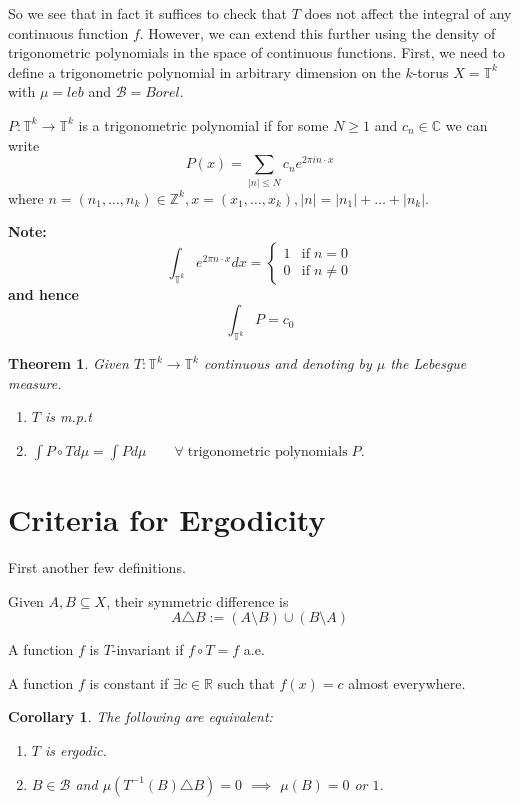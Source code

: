 \documentclass[11pt]{article}
\newcommand{\defeq}{:=}
\newcommand{\abs}[1]{\left|#1\right|}
\newcommand{\symd}{\triangle}
\newcommand{\ktor}{\mathbb{T}^k}
\newcommand{\R}{\mathbb{R}}
\newcommand{\C}{\mathbb{C}}
\newcommand{\Z}{\mathbb{Z}}
\newenvironment{defin}
	{\begin{mdframed}[backgroundcolor=white, roundcorner=5pt, linewidth=1pt]}
	{\end{mdframed}}
\newcommand{\mdf}[1]{{\color{red} #1}}
\newenvironment{note}
	{\begin{mdframed}[backgroundcolor=white, linecolor=red, roundcorner=5pt, linewidth=1pt]\bfseries{Note:}\normalfont}
	{\end{mdframed}}
\newtheorem{theorem}[prop]{Theorem}
\newtheorem{cor}[prop]{Corollary}
\begin{document}
So we see that in fact it suffices to check that $T$ does not affect the integral of any continuous function $f$.
However, we can extend this further using the density of trigonometric polynomials in the space of continuous functions. 
First, we need to define a trigonometric polynomial in arbitrary dimension on the $k$-torus $X=\ktor$ with $\mu=leb$ and $\mathcal{B}=Borel$.
\begin{defin}
	$P:\ktor\to\ktor$ is a \mdf{trigonometric polynomial} if for some $N\geq 1$ and $c_n\in\C$ we can write
	$$P(x)=\sum_{\abs{n}\leq N} c_n e^{2\pi in\cdot x}$$
	where $n=(n_1,\dots,n_k)\in\Z^k, x=(x_1,\dots,x_k), \abs{n}=\abs{n_1}+\dots+\abs{n_k}$.
\end{defin}
\begin{note}
	\[
		\int_{\ktor} e^{2\pi n\cdot x} dx =
		\begin{cases}
			1 & \text{if} \; n=0\\
			0 & \text{if} \; n\neq 0
		\end{cases}
	\]
	and hence
	$$\int_{\ktor}P = c_0$$
\end{note}

\begin{theorem}
Given $T:\ktor\to \ktor$ continuous and denoting by $\mu$ the Lebesgue measure.
\begin{enumerate}
	\item $T$ is m.p.t
	\item $\int P\circ T d\mu = \int P d\mu \quad\quad \forall\; \text{trigonometric polynomials}\; P$. 
\end{enumerate}
\end{theorem}

\section{Criteria for Ergodicity}
First another few definitions.
\begin{defin}
Given $A,B\subseteq X$, their \mdf{symmetric difference} is
$$A\symd B\defeq (A \setminus B)\cup (B \setminus A)$$

A function $f$ is \mdf{$T$-invariant} if $f \circ T = f$ a.e.

A function $f$ is \mdf{constant} if $\exists c\in\R$ such that $f(x) = c$ almost everywhere.
\end{defin}

\begin{cor}
The following are equivalent:
\begin{enumerate}
	\item $T$ is ergodic.
	\item $B\in \mathcal{B}$ and $\mu(T^{-1}(B) \symd B) = 0$ $\implies$ $\mu(B) = 0 $ or $1$.
\end{enumerate}
\end{cor}
\end{document}

